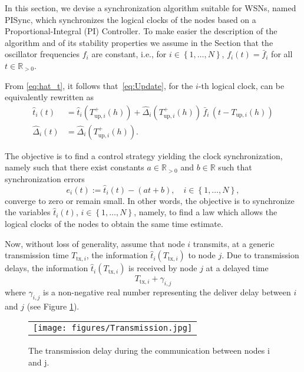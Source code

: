 \documentclass[english,a4paper,10pt,final]{article}
\numberwithin{equation}{section}
\numberwithin{figure}{section}
\begin{document}
In this section, we devise a synchronization algorithm suitable for WSNs, named PISync, which synchronizes the logical clocks of the nodes based on a Proportional-Integral (PI) Controller. 
To make easier the description of the algorithm and of its stability properties we assume in the Section that the oscillator frequencies $f_i$ are constant, i.e., for $i\in\left\{1,\ldots,N\right\}$, $f_i(t) = \bar{f}_i$ for all $t\in\mathbb{R}_{>0}$. 

\vspace{0.1cm}

From \eqref{eq:hat_t}, it follows that~\eqref{eq:Update}, for the $i$-th logical clock, can be equivalently rewritten as
\begin{align}\label{eq:UpdateDelayed-f_constant}
    \hat{t}_i(t) & =  \hat{t}_i(T_{\mathrm{up},i}^+(h)) + \hat{\Delta}_i(T_{\mathrm{up},i}^+(h))\,\bar{f}_i\,(t-T_{\mathrm{up},i}(h))\nonumber\\
  \hat{\Delta}_i(t) & =  \hat{\Delta}_i(T_{\mathrm{up},i}^+(h)).
\end{align}
 
 The objective is to find a control strategy yielding the clock synchronization, namely such that there exist constants $a\in\mathbb{R}_{>0}$ and $b\in\mathbb{R}$ such that synchronization errors 
\begin{equation}
  \label{eq:SynchErrors}
  e_i(t) := \hat{t}_i(t) - (a t + b), \quad i \in \left\{1,\ldots,N\right\},
\end{equation}
converge  to zero or remain small. In other words, the objective is to synchronize the variables $\hat{t}_i(t)$, $i\in\left\{1,\ldots,N\right\}$, namely, to find a law which allows the logical clocks of the nodes to obtain the same time estimate.

Now, without loss of generality, assume that node $i$ transmits, at a generic transmission time $T_{\mathrm{tx},i}$, the information $\hat{t}_i(T_{\mathrm{tx},i})$ to node $j$. Due to transmission delays, 
the information $\hat{t}_i(T_{\mathrm{tx},i})$ is received by node $j$ at a delayed time
$$
T_{\mathrm{tx},i}+\gamma_{i,j}
$$
where $\gamma_{i,j}$ is a non-negative real number representing the deliver delay between $i$ and $j$ (see Figure \ref{fig:tx}).

\begin{figure}
\begin{center}
\begin{tabular}{c}
\texttt{[image: figures/Transmission.jpg]}
\end{tabular}
\caption{\label{fig:tx}The transmission delay during the communication between nodes i and j.}
\end{center}
\end{figure}
\end{document}
